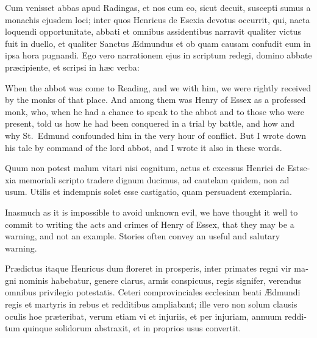 \documentclass[10pt]{book}
\begin{document}
\begin{paracol}{2}
\switchcolumn*

\begin{otherlanguage}{latin}
Cum venisset abbas apud Radingas, et nos cum eo, sicut decuit, suscepti sumus a monachis ejusdem loci; inter quos Henricus de Esexia devotus occurrit, qui, nacta loquendi opportunitate, abbati et omnibus assidentibus narravit qualiter victus fuit in duello, et qualiter Sanctus \AE{}dmundus et ob quam causam confudit eum in ipsa hora pugnandi. Ego vero narrationem ejus in scriptum redegi, domino abbate pr\ae{}cipiente, et scripsi in h\ae{}c verba:
\end{otherlanguage}

\switchcolumn

When the abbot was come to Reading, and we with him, we were rightly received by the monks of that place. And among them was Henry of Essex as a professed monk, who, when he had a chance to speak to the abbot and to those who were present, told us how he had been conquered in a trial by battle, and how and why St.\ Edmund confounded him in the very hour of conflict. But I wrote down his tale by command of the lord abbot, and I wrote it also in these words.

\switchcolumn*

\begin{otherlanguage}{latin}
Quum non potest malum vitari nisi cognitum, actus et excessus Henrici de Estsexia memoriali scripto tradere dignum ducimus, ad cautelam quidem, non ad usum. Utilis et indempnis solet esse castigatio, quam persuadent exemplaria.
\end{otherlanguage}

\switchcolumn

Inasmuch as it is impossible to avoid unknown evil, we have thought it well to commit to writing the acts and crimes of Henry of Essex, that they may be a warning, and not an example. Stories often convey an useful and salutary warning.

\switchcolumn*

\begin{otherlanguage}{latin}
Pr\ae{}dictus itaque Henricus dum floreret in prosperis, inter primates regni vir magni nominis habebatur, genere clarus, armis conspicuus, regis signifer, verendus omnibus privilegio potestatis. Ceteri comprovinciales ecclesiam beati \AE{}dmundi regis et martyris in rebus et redditibus ampliabant; ille vero non solum clausis oculis hoe pr\ae{}teribat, verum etiam vi et injuriis, et per injuriam, annuum redditum quinque solidorum abstraxit, et in proprios usus convertit.
\end{otherlanguage}


\end{paracol}
\end{document}
